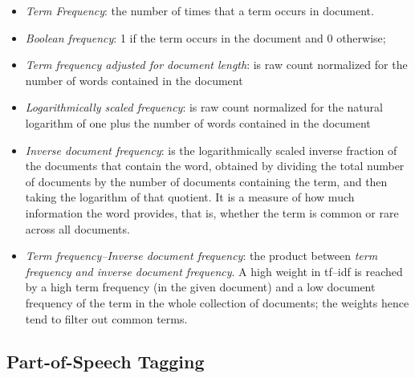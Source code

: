 \documentclass[]{book}
\providecommand{\tightlist}{%
  \setlength{\itemsep}{0pt}\setlength{\parskip}{0pt}}
\begin{document}
\begin{itemize}
\tightlist
\item
  \emph{Term Frequency}: the number of times that a term occurs in
  document.
\item
  \emph{Boolean frequency}: 1 if the term occurs in the document and 0
  otherwise;
\item
  \emph{Term frequency adjusted for document length}: is raw count
  normalized for the number of words contained in the document
\item
  \emph{Logarithmically scaled frequency}: is raw count normalized for
  the natural logarithm of one plus the number of words contained in the
  document
\item
  \emph{Inverse document frequency}: is the logarithmically scaled
  inverse fraction of the documents that contain the word, obtained by
  dividing the total number of documents by the number of documents
  containing the term, and then taking the logarithm of that quotient.
  It is a measure of how much information the word provides, that is,
  whether the term is common or rare across all documents.
\item
  \emph{Term frequency--Inverse document frequency}: the product between
  \emph{term frequency and inverse document frequency}. A high weight in
  tf--idf is reached by a high term frequency (in the given document)
  and a low document frequency of the term in the whole collection of
  documents; the weights hence tend to filter out common terms.
\end{itemize}

\subsection{Part-of-Speech Tagging}\label{sotatoolstransformpos}
\end{document}
